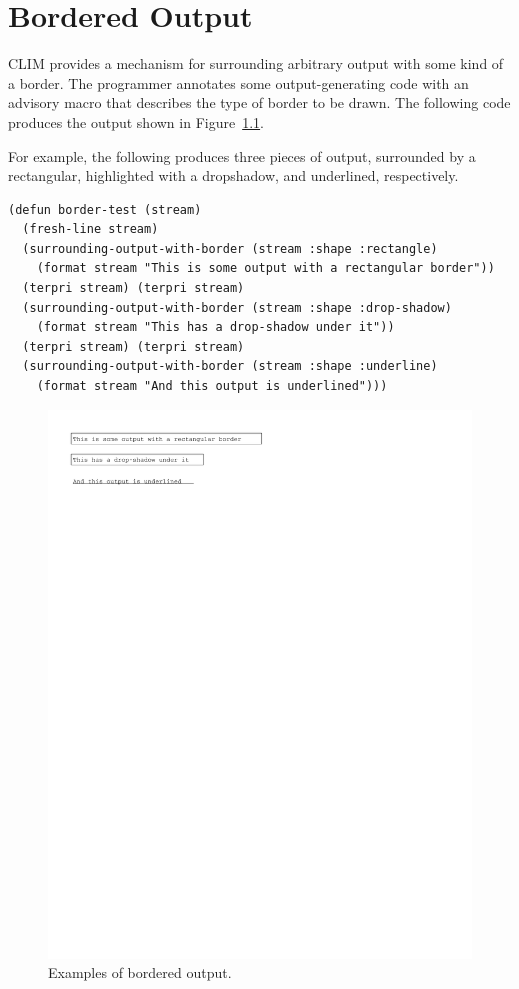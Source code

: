 
\chapter {Bordered Output}
\label {bordered-output}

CLIM provides a mechanism for surrounding arbitrary output with some kind of a
border.  The programmer annotates some output-generating code with an advisory
macro that describes the type of border to be drawn.  The following code
produces the output shown in Figure~\ref{border-example}.

For example, the following produces three pieces of output, surrounded by a
rectangular, highlighted with a dropshadow, and underlined, respectively.

\begin{verbatim}
(defun border-test (stream)
  (fresh-line stream)
  (surrounding-output-with-border (stream :shape :rectangle)
    (format stream "This is some output with a rectangular border"))
  (terpri stream) (terpri stream)
  (surrounding-output-with-border (stream :shape :drop-shadow)
    (format stream "This has a drop-shadow under it"))
  (terpri stream) (terpri stream)
  (surrounding-output-with-border (stream :shape :underline)
    (format stream "And this output is underlined")))
\end{verbatim}

\begin{figure}
\centerline{\includegraphics{border-example}}
\caption{\label{border-example} Examples of bordered output.}
\end{figure}



